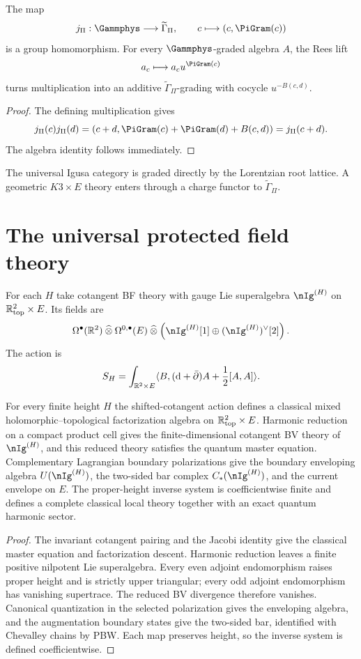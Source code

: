 \begin{theorem}
The map
\[
 j_\Pi:\Gammphys\longrightarrow\widetilde\Gamma_\Pi,
 \qquad
 c\longmapsto(c,\PiGram(c))
\]
is a group homomorphism.  For every $\Gammphys$-graded algebra $A$, the Rees lift
\[
 a_c\longmapsto a_cu^{\PiGram(c)}
\]
turns multiplication into an additive $\widetilde\Gamma_\Pi$-grading with cocycle $u^{-B(c,d)}$.
\end{theorem}
\begin{proof}
The defining multiplication gives
\[
 j_\Pi(c)j_\Pi(d)
 =(c+d,\PiGram(c)+\PiGram(d)+B(c,d))
 =j_\Pi(c+d).
\]
The algebra identity follows immediately.
\end{proof}

The universal Igusa category is graded directly by the Lorentzian root lattice.  A geometric $K3\times E$ theory enters through a charge functor to $\widetilde\Gamma_\Pi$.

\chapter{The universal protected field theory}
For each $H$ take cotangent BF theory with gauge Lie superalgebra $\nIg^{(H)}$ on $\mathbb R^2_{\mathrm{top}}\times E$.  Its fields are
\[
 \Omega^\bullet(\R^2)\widehattensor
 \Omega^{0,\bullet}(E)
 \widehattensor
 \left(\nIg^{(H)}[1]\oplus(\nIg^{(H)})^\vee[2]\right).
\]
The action is
\[
 S_H=\int_{\mathbb R^2\times E}
 \langle B,(\mathrm d+\bar\partial)A+\frac12[A,A]\rangle.
\]

\begin{theorem}
For every finite height $H$ the shifted-cotangent action defines a classical mixed holomorphic--topological factorization algebra on $\mathbb R^2_{\mathrm{top}}\times E$.  Harmonic reduction on a compact product cell gives the finite-dimensional cotangent BV theory of $\nIg^{(H)}$, and this reduced theory satisfies the quantum master equation.  Complementary Lagrangian boundary polarizations give the boundary enveloping algebra $U(\nIg^{(H)})$, the two-sided bar complex $C_*(\nIg^{(H)})$, and the current envelope on $E$.  The proper-height inverse system is coefficientwise finite and defines a complete classical local theory together with an exact quantum harmonic sector.
\end{theorem}
\begin{proof}
The invariant cotangent pairing and the Jacobi identity give the classical master equation and factorization descent.  Harmonic reduction leaves a finite positive nilpotent Lie superalgebra.  Every even adjoint endomorphism raises proper height and is strictly upper triangular; every odd adjoint endomorphism has vanishing supertrace.  The reduced BV divergence therefore vanishes.  Canonical quantization in the selected polarization gives the enveloping algebra, and the augmentation boundary states give the two-sided bar, identified with Chevalley chains by PBW.  Each map preserves height, so the inverse system is defined coefficientwise.
\end{proof}


